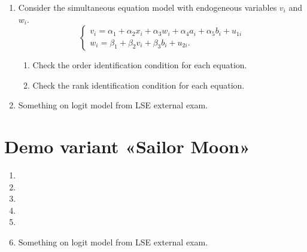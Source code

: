 \documentclass[12pt]{article}
\begin{document}
\begin{enumerate}
    \item Consider the simultaneous equation model with endogeneous variables $v_i$ and $w_i$.
    \[
    \begin{cases}
        v_i = \alpha_1 + \alpha_2 x_i + \alpha_3 w_i + \alpha_4 a_i + \alpha_5 b_i + u_{1i} \\
        w_i = \beta_1 + \beta_2 v_i + \beta_3 b_i + u_{2i}.
    \end{cases}
    \]

    \begin{enumerate}
        \item Check the order identification condition for each equation. 
        \item Check the rank identification condition for each equation. 
    \end{enumerate}

    \item Something on logit model from LSE external exam. 
\end{enumerate}


\section*{Demo variant «Sailor Moon»}
\begin{enumerate}
    \item 
    \item 
    \item 
    \item 
    \item 

    \item Something on logit model from LSE external exam. 

\end{enumerate}
\end{document}

